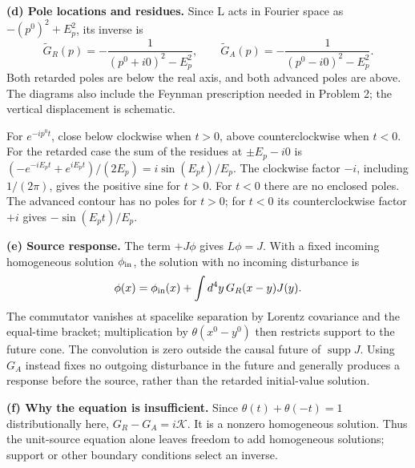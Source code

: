 \documentclass[11pt]{article}
\newcommand{\partsol}[2]{\par\Needspace{4\baselineskip}\medskip\noindent\textbf{(#1) #2.}\quad}
\begin{document}
\partsol{d}{Pole locations and residues}
Since L acts in Fourier space as \(-(p^0)^2+E_p^2\), its inverse is
\[
 \widetilde G_R(p)=-\frac1{(p^0+i0)^2-E_p^2},\qquad
 \widetilde G_A(p)=-\frac1{(p^0-i0)^2-E_p^2}.
\]
Both retarded poles are below the real axis, and both advanced poles
are above. The diagrams also include the Feynman prescription needed in
Problem 2; the vertical displacement is schematic.
\begin{center}
\end{center}
For \(e^{-ip^0t}\), close below clockwise when \(t>0\), above
counterclockwise when \(t<0\). For the retarded case the sum of the
residues at \(\pm E_p-i0\) is
\((-e^{-iE_pt}+e^{iE_pt})/(2E_p)=i\sin(E_pt)/E_p\).
The clockwise factor \(-i\), including \(1/(2\pi)\), gives the positive
sine for \(t>0\). For \(t<0\) there are no enclosed poles.
The advanced contour has no poles for \(t>0\); for \(t<0\) its
counterclockwise factor \(+i\) gives \(-\sin(E_pt)/E_p\).

\partsol{e}{Source response}
The term \(+J\phi\) gives \(L\phi=J\). With a fixed incoming homogeneous
solution \(\phi_{\rm in}\), the solution with no incoming disturbance is
\[
 \phi(x)=\phi_{\rm in}(x)+\int d^4y\,G_R(x-y)J(y).
\]
The commutator vanishes at spacelike separation by Lorentz covariance
and the equal-time bracket; multiplication by \(\theta(x^0-y^0)\) then
restricts support to the future cone. The convolution is zero outside
the causal future of \(\operatorname{supp}J\). Using \(G_A\) instead fixes
no outgoing disturbance in the future and generally produces a response
before the source, rather than the retarded initial-value solution.

\partsol{f}{Why the equation is insufficient}
Since \(\theta(t)+\theta(-t)=1\) distributionally here,
\(G_R-G_A=i\mathcal K\). It is a nonzero homogeneous solution. Thus the
unit-source equation alone leaves freedom to add homogeneous solutions;
support or other boundary conditions select an inverse.
\end{document}
